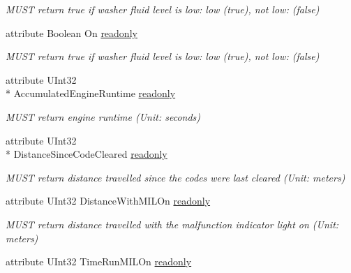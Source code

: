 \begin{DoxyCompactItemize}
\begin{DoxyCompactList}\small\item\em M\+U\+S\+T return true if washer fluid level is low\+: low (true), not low\+: (false) \end{DoxyCompactList}\item 
\hypertarget{interfaceVehiclePropertyType_a528390d47d556b5ed19e553e869b0337}{attribute Boolean On \hyperlink{interfaceVehiclePropertyType_a528390d47d556b5ed19e553e869b0337}{readonly}}\label{interfaceVehiclePropertyType_a528390d47d556b5ed19e553e869b0337}

\begin{DoxyCompactList}\small\item\em M\+U\+S\+T return true if washer fluid level is low\+: low (true), not low\+: (false) \end{DoxyCompactList}\item 
\hypertarget{interfaceVehiclePropertyType_ad61ab7456d7cc8bca79ab6b6151ffb37}{attribute U\+Int32 \\*
Accumulated\+Engine\+Runtime \hyperlink{interfaceVehiclePropertyType_ad61ab7456d7cc8bca79ab6b6151ffb37}{readonly}}\label{interfaceVehiclePropertyType_ad61ab7456d7cc8bca79ab6b6151ffb37}

\begin{DoxyCompactList}\small\item\em M\+U\+S\+T return engine runtime (Unit\+: seconds) \end{DoxyCompactList}\item 
\hypertarget{interfaceVehiclePropertyType_a413216171a15c0eea2435a0f3cf9fa5e}{attribute U\+Int32 \\*
Distance\+Since\+Code\+Cleared \hyperlink{interfaceVehiclePropertyType_a413216171a15c0eea2435a0f3cf9fa5e}{readonly}}\label{interfaceVehiclePropertyType_a413216171a15c0eea2435a0f3cf9fa5e}

\begin{DoxyCompactList}\small\item\em M\+U\+S\+T return distance travelled since the codes were last cleared (Unit\+: meters) \end{DoxyCompactList}\item 
\hypertarget{interfaceVehiclePropertyType_a364e68bedb72fc982354e82cefc377e9}{attribute U\+Int32 Distance\+With\+M\+I\+L\+On \hyperlink{interfaceVehiclePropertyType_a364e68bedb72fc982354e82cefc377e9}{readonly}}\label{interfaceVehiclePropertyType_a364e68bedb72fc982354e82cefc377e9}

\begin{DoxyCompactList}\small\item\em M\+U\+S\+T return distance travelled with the malfunction indicator light on (Unit\+: meters) \end{DoxyCompactList}\item 
\hypertarget{interfaceVehiclePropertyType_a1678d17008552e249fe7ea7e1178bc7f}{attribute U\+Int32 Time\+Run\+M\+I\+L\+On \hyperlink{interfaceVehiclePropertyType_a1678d17008552e249fe7ea7e1178bc7f}{readonly}}\label{interfaceVehiclePropertyType_a1678d17008552e249fe7ea7e1178bc7f}


\end{DoxyCompactItemize}
